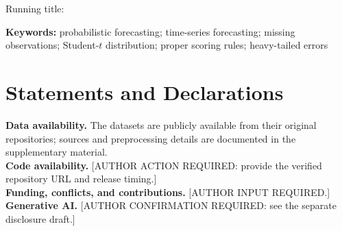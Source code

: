 \documentclass[11pt]{article}
\begin{document}
\title{\PaperTitle}
\author{Anonymous review copy}
\date{}
\maketitle
\begin{center}\small Running title: \ShortTitle\end{center}
\begin{abstract}

\end{abstract}
\noindent\textbf{Keywords:} probabilistic forecasting; time-series forecasting; missing observations; Student-$t$ distribution; proper scoring rules; heavy-tailed errors












\section*{Statements and Declarations}
\textbf{Data availability.} The datasets are publicly available from their original repositories; sources and preprocessing details are documented in the supplementary material.\\
\textbf{Code availability.} [AUTHOR ACTION REQUIRED: provide the verified repository URL and release timing.]\\
\textbf{Funding, conflicts, and contributions.} [AUTHOR INPUT REQUIRED.]\\
\textbf{Generative AI.} [AUTHOR CONFIRMATION REQUIRED: see the separate disclosure draft.]


\end{document}
